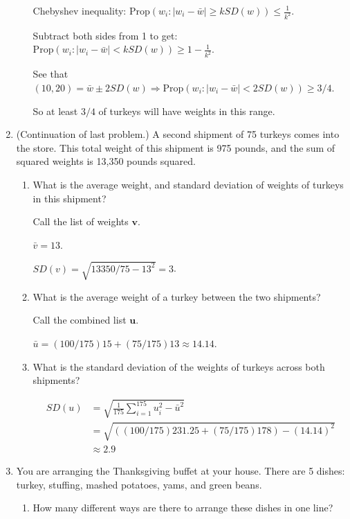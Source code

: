 \documentclass[11pt]{article}
\begin{document}
\begin{enumerate}
\begin{enumerate}
    {\color{red} Chebyshev inequality: $\mathrm{Prop}(w_i : |w_i - \bar w| \geq k SD(w)) \leq \frac{1}{k^2}$.

    Subtract both sides from 1 to get: $\mathrm{Prop}(w_i : |w_i - \bar w| < k SD(w)) \geq 1 - \frac{1}{k^2}$.

    See that $(10, 20) = \bar w \pm 2 SD(w) \Rightarrow \mathrm{Prop}(w_i : |w_i - \bar w| < 2 SD(w)) \geq 3/4$.

    So at least $3/4$ of turkeys will have weights in this range.}
\end{enumerate}

\item (Continuation of last problem.) A second shipment of 75 turkeys comes into the store. This total weight of this shipment is 975 pounds, and the sum of squared weights is 13,350 pounds squared.
\begin{enumerate}
    \item What is the average weight, and standard deviation of weights of turkeys in this shipment?

    {\color{red} Call the list of weights $\bm v$.

    $\bar v = 13$.

    $SD(v) = \sqrt{13350 / 75 - 13^2} = 3$.}

    \item What is the average weight of a turkey between the two shipments?

    {\color{red} Call the combined list $\bm u$.

    $\bar u = (100/175)15 + (75/175)13 \approx 14.14$.}

    \item What is the standard deviation of the weights of turkeys across both shipments? 

     {\color{red}

    \begin{align*}
        SD(u) &= \sqrt{\frac{1}{175}\sum_{i=1}^{175} u_i^2 - \bar u^2}\\
              &= \sqrt{((100/175) 231.25 + (75/175) 178) - (14.14)^2}\\
              &\approx 2.9
    \end{align*}
    }
\end{enumerate}

\item You are arranging the Thanksgiving buffet at your house. There are 5 dishes: turkey, stuffing, mashed potatoes, yams, and green beans.
\begin{enumerate}
    \item How many different ways are there to arrange these dishes in one line? 


\end{enumerate}
\end{enumerate}
\end{document}
